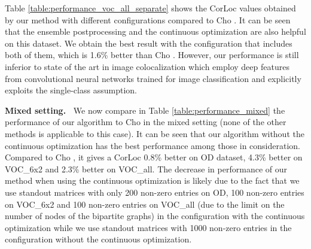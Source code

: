 \documentclass[10pt,twocolumn,letterpaper]{article}
\numberwithin{theorem}{section}
\newcommand{\parag}[1]{\vspace{4pt}\noindent\textbf{#1~}}
\begin{document}
Table \ref{table:performance_voc_all_separate} shows the CorLoc values obtained by our method with different configurations compared to Cho \etal. It can be seen that the ensemble postprocessing and the continuous optimization are also helpful on this dataset. We obtain the best result with the configuration that includes both of them, which is 1.6\% better than Cho \etal. However, our performance is still inferior to state of the art in image colocalization \cite{Li2016, Wei2017} which employ deep features from convolutional neural networks trained for image classification and explicitly exploits the single-class assumption. 

\parag{Mixed setting.} 
We now compare in Table \ref{table:performance_mixed} the performance of our algorithm to Cho \etal in the mixed setting (none of the other methods is applicable to this case). It can be seen that our algorithm without the continuous optimization has the best performance among those in consideration. Compared to Cho \etal, it gives a CorLoc 0.8\% better on OD dataset, 4.3\% better on VOC\_6x2 and 2.3\% better on VOC\_all. The decrease in performance of our method when using the continuous optimization is likely due to the fact that we use standout matrices with only 200 non-zero entries on OD, 100 non-zero entries on VOC\_6x2 and 100 non-zero entries on VOC\_all (due to the limit on the number of nodes of the bipartite graphs) in the configuration with the continuous optimization while we use standout matrices with 1000 non-zero entries in the configuration without the continuous optimization.  

\begin{table}
\centering
{}
\vspace{-2mm}
\caption{\small Performance on the datasets in mixed setting.}
\label{table:performance_mixed}
\end{table}
\end{document}
